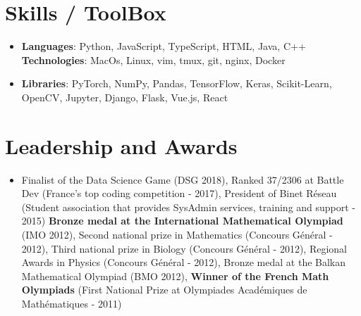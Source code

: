 \documentclass[letterpaper,10pt]{article}
\newcommand{\resumeSubHeadingListStart}{\begin{itemize}[leftmargin=*]}
\newcommand{\resumeSubHeadingListEnd}{\end{itemize}}
\newcommand{\shorterSection}[1]{\vspace{-10pt}\section{#1}}
\begin{document}
\shorterSection{Skills / ToolBox}
  \resumeSubHeadingListStart
  \small
    \item{
     \textbf{Languages}{: Python, JavaScript, TypeScript, HTML, Java, C++}
     \hfill
     \textbf{Technologies}{: MacOs, Linux, vim, tmux, git, nginx, Docker}
    }
    \vspace{-5pt}
    \item{
     \textbf{Libraries}{: PyTorch, NumPy, Pandas, TensorFlow, Keras, Scikit-Learn, OpenCV, Jupyter, Django, Flask, Vue.js, React}
    }
\resumeSubHeadingListEnd

\shorterSection{Leadership and Awards}
  \resumeSubHeadingListStart
    \item[]\small{
        {Finalist of the Data Science Game (DSG 2018), Ranked 37/2306 at Battle Dev (France's top coding competition - 2017), President of Binet Réseau (Student association that provides SysAdmin services, training and support - 2015) \textbf{Bronze medal at the International Mathematical Olympiad} (IMO 2012), Second national prize in Mathematics (Concours Général - 2012),  Third national prize in Biology (Concours Général - 2012),  Regional Awards in Physics (Concours Général - 2012), Bronze medal at the Balkan Mathematical Olympiad (BMO 2012), \textbf{Winner of the French Math Olympiads} (First National Prize at Olympiades Académiques de Mathématiques - 2011)  \vspace{-6pt}}
    }
  \resumeSubHeadingListEnd
\end{document}
